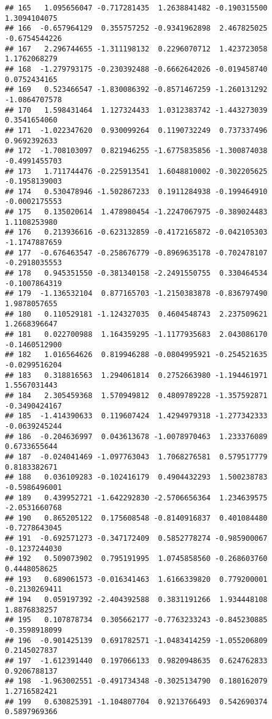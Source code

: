 \documentclass[
]{article}
\begin{document}
\begin{verbatim}
## 165   1.095656047 -0.717281435  1.2638841482 -0.190315500  1.3094104075
## 166  -0.657964129  0.355757252 -0.9341962898  2.467825025 -0.6754544226
## 167   2.296744655 -1.311198132  0.2296070712  1.423723058  1.1762068279
## 168  -1.279793175 -0.230392488 -0.6662642026 -0.019458740  0.0752434165
## 169   0.523466547 -1.830086392 -0.8571467259 -1.260131292 -1.0864707578
## 170   1.598431464  1.127324433  1.0312383742 -1.443273039  0.3541654060
## 171  -1.022347620  0.930099264  0.1190732249  0.737337496  0.9692392633
## 172  -1.708103097  0.821946255 -1.6775835856 -1.300874038 -0.4991455703
## 173   1.711744476 -0.225913541  1.6048810002 -0.302205625 -0.1958139003
## 174   0.530478946 -1.502867233  0.1911284938 -0.199464910 -0.0002175553
## 175   0.135020614  1.478980454 -1.2247067975 -0.389024483  1.1108253980
## 176   0.213936616 -0.623132859 -0.4172165872 -0.042105303 -1.1747887659
## 177  -0.676463547 -0.258676779 -0.8969635178 -0.702478107 -0.2918035553
## 178   0.945351550 -0.381340158 -2.2491550755  0.330464534 -0.1007864319
## 179  -1.136532104  0.877165703 -1.2150383878 -0.836797490  1.9878057655
## 180   0.110529181 -1.124327035  0.4604548743  2.237509621  1.2668396647
## 181   0.022700988  1.164359295 -1.1177935683  2.043086170 -0.1460512900
## 182   1.016564626  0.819946288 -0.0804995921 -0.254521635 -0.0299516204
## 183   0.318816563  1.294061814  0.2752663980 -1.194461971  1.5567031443
## 184   2.305459368  1.570949812  0.4809789228 -1.357592871 -0.3490424167
## 185  -1.414390633  0.119607424  1.4294979318 -1.277342333 -0.0639245244
## 186  -0.204636997  0.043613678 -1.0078970463  1.233376089  0.6733655644
## 187  -0.024041469 -1.097763043  1.7068276581  0.579517779  0.8183382671
## 188   0.036109283 -0.102416179  0.4904432293  1.500238783 -0.5986496001
## 189   0.439952721 -1.642292830 -2.5706656364  1.234639575 -2.0531660768
## 190   0.865205122  0.175608548 -0.8140916837  0.401084480 -0.7278643045
## 191  -0.692571273 -0.347172409  0.5852778274 -0.985900067 -0.1237244030
## 192   0.509073902  0.795191995  1.0745858560 -0.268603760  0.4448058625
## 193   0.689061573 -0.016341463  1.6166339820  0.779200001 -0.2130269411
## 194   0.059197392 -2.404392588  0.3831191266  1.934448108  1.8876838257
## 195   0.107878734  0.305662177 -0.7763233243 -0.845230885 -0.3598918099
## 196  -0.901425139  0.691782571 -1.0483414259 -1.055206809  0.2145027837
## 197  -1.612391440  0.197066133  0.9820948635  0.624762833  0.9206788137
## 198  -1.963002551 -0.491734348 -0.3025134790  0.180162079  1.2716582421
## 199   0.630825391 -1.104807704  0.9213766493  0.542690374  0.5897969366

\end{verbatim}
\end{document}

